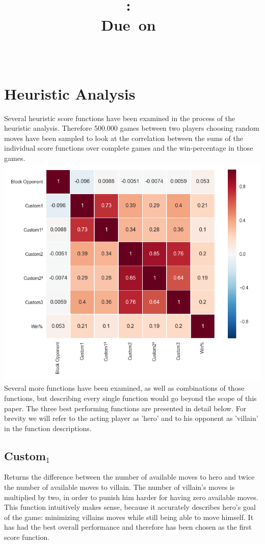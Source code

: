 \documentclass{article}
\title{
\vspace{2in}
\textmd{\textbf{\courseName:\ \pageTitle}}\\
\normalsize\vspace{0.1in}\small{Due\ on\ \hmwkDueDate}\\
\vspace{0.1in}\large{\textit{\hmwkClassInstructor\ \hmwkClassTime}}
\vspace{3in}
}
\author{\textbf{\authorName}}
\date{} %
\begin{document}
\section{Heuristic Analysis}
Several heuristic score functions have been examined in the process of the heuristic
analysis. Therefore 500.000 games between two players choosing random moves have been
sampled to look at the correlation between the sums of the individual score functions
over complete games and the win-percentage in those games.
\includegraphics[width=\textwidth]{./correlation.png}
Several more functions have been examined, as well as combinations of those functions,
but describing every single function would go beyond the scope of this paper.
The three best performing functions are presented in detail below. For brevity we will refer
to the acting player as 'hero' and to his opponent as 'villain' in the function
descriptions.

\subsection{Custom$_1$}
Returns the difference between the number of available moves to hero and twice the
number of available moves to villain. The number of villain's moves is multiplied
by two, in order to punish him harder for having zero available moves. This function
intuitively makes sense, because it accurately describes hero's goal of the game: minimizing
villains moves while still being able to move himself. It has had the best overall
performance and therefore has been chosen as the first score function.
\end{document}
